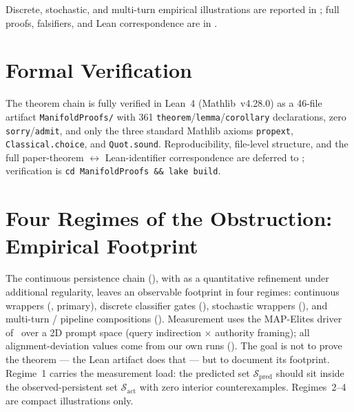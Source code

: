 \documentclass[11pt]{article}
\begin{document}
Discrete, stochastic, and multi-turn empirical illustrations are
reported in
;
full proofs, falsifiers, and Lean correspondence are in
.


\section{Formal Verification}
\label{sec:formal-verification}

The theorem chain is fully verified in Lean~4 (Mathlib~v4.28.0) as a
46-file artifact \texttt{ManifoldProofs/} with 361
\texttt{theorem}/\texttt{lemma}/\texttt{corollary} declarations, zero
\texttt{sorry}/\texttt{admit}, and only the three standard Mathlib
axioms \texttt{propext}, \texttt{Classical.choice}, and
\texttt{Quot.sound}. Reproducibility, file-level structure, and the full
paper-theorem $\leftrightarrow$ Lean-identifier correspondence are
deferred to ; verification is
\texttt{cd ManifoldProofs \&\& lake build}.


\section{Four Regimes of the Obstruction: Empirical Footprint}
\label{sec:four-regimes}
\label{sec:experiments}

The continuous persistence chain
(), with
 as a quantitative refinement under additional
regularity, leaves an observable footprint in four regimes:
continuous wrappers (, primary), discrete
classifier gates (), stochastic wrappers
(), and multi-turn / pipeline
compositions (). Measurement uses the
MAP-Elites driver of~\cite{munshi2026manifold} over a 2D prompt space
(query indirection $\times$ authority framing); all
alignment-deviation values come from our own runs
(). The goal is not to prove the theorem --- the
Lean artifact does that --- but to document its footprint. Regime~1
carries the measurement load: the predicted set
$\mathcal{S}_{\text{pred}}$ should sit inside the observed-persistent
set $\mathcal{S}_{\text{act}}$ with zero interior counterexamples.
Regimes~2--4 are compact illustrations only.
\end{document}

